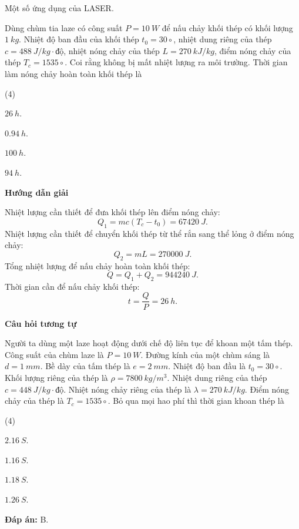 \begin{dang}{Một số ứng dụng của LASER.}
{
Dùng chùm tia laze có công suất $ P = \SI{10}{W} $ để nấu chảy khối thép có khối lượng $ \SI{1}{kg} $. Nhiệt độ ban đầu của khối thép $ t_{0} = 30\circ $, nhiệt dung riêng của thép $ c = \SI{488}{J/kg \cdot \text{độ}} $, nhiệt nóng chảy của thép $ L = \SI{270}{kJ/kg} $, điểm nóng chảy của thép $ T_{c} = 1535\circ $. Coi rằng không bị mất nhiệt lượng ra môi trường. Thời gian làm nóng chảy hoàn toàn khối thép là
\begin{mcq}(4)
	\item $ \SI{26}{h} $.
	\item $ \SI{0,94}{h} $.
	\item $ \SI{100}{h} $.
	\item $ \SI{94}{h} $.
\end{mcq}
}
{
\begin{center}
	\textbf{Hướng dẫn giải}
\end{center}
Nhiệt lượng cần thiết để đưa khối thép lên điểm nóng chảy:
$$
	Q_{1} = mc\left( T_{c} - t_{0} \right) = \SI{67420}{J}.
$$
Nhiệt lượng cần thiết để chuyển khối thép từ thể rắn sang thể lỏng ở điểm nóng chảy:
$$
	Q_{2} = mL = \SI{270000}{J}.
$$
Tổng nhiệt lượng để nấu chảy hoàn toàn khối thép:
$$
	Q = Q_{1} + Q_{2} = \SI{944240}{J}.
$$
Thời gian cần để nấu chảy khối thép:
$$
	t = \dfrac{Q}{P} = \SI{26}{h}.
$$

\begin{center}
	\textbf{Câu hỏi tương tự}
\end{center}
Người ta dùng một laze hoạt động dưới chế độ liên tục để khoan một tấm thép. Công suất của chùm laze là $ P = \SI{10}{W} $. Đường kính của một chùm sáng là $ d = \SI{1}{mm} $. Bề dày của tấm thép là $ e = \SI{2}{mm} $. Nhiệt độ ban đầu là $ t_{0} = 30\circ $. Khối lượng riêng của thép là $ \rho = \SI{7800}{kg/m^{3}} $. Nhiệt dung riêng của thép $ c = \SI{448}{J/kg \cdot \text{độ}} $. Nhiệt nóng chảy riêng của thép là $ \lambda = \SI{270}{kJ/kg} $. Điểm nóng chảy của thép là $ T_{c} = 1535\circ $. Bỏ qua mọi hao phí thì thời gian khoan thép là
\begin{mcq}(4)
	\item $ \SI{2,16}{S} $.
	\item $ \SI{1,16}{S} $.
	\item $ \SI{1,18}{S} $.
	\item $ \SI{1,26}{S} $.
\end{mcq}
\textbf{Đáp án:} B.
}

\end{dang}